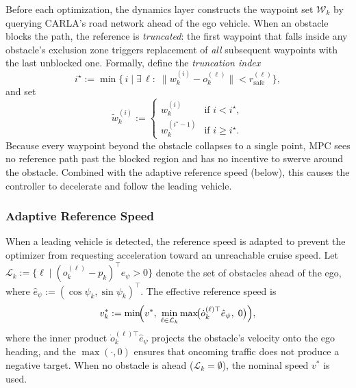 \documentclass[conference]{IEEEtran}
\newcommand{\calW}{\mathcal{W}}
\newcommand{\calL}{\mathcal{L}}
\begin{document}
Before each optimization, the dynamics layer constructs the
waypoint set $\calW_k$ by querying CARLA's road network ahead
of the ego vehicle.
When an obstacle blocks the path, the reference is
\emph{truncated}: the first waypoint that falls inside any
obstacle's exclusion zone triggers replacement of \emph{all}
subsequent waypoints with the last unblocked one.  Formally,
define the \emph{truncation index}
\begin{equation}\label{eq:trunc_idx}
  i^\star := \min\bigl\{\,i \;\big|\;
    \exists\,\ell:\;
    \bigl\|w^{(i)}_k - o^{(\ell)}_k\bigr\|
    < r_{\mathrm{safe}}^{(\ell)}\bigr\},
\end{equation}
and set
\begin{equation}\label{eq:wp_filter}
  \tilde{w}^{(i)}_k :=
  \begin{cases}
    w^{(i)}_k & \text{if } i < i^\star, \\[3pt]
    w^{(i^\star - 1)}_k & \text{if } i \ge i^\star.
  \end{cases}
\end{equation}
Because every waypoint beyond the obstacle collapses to a single
point, MPC sees no reference path past the blocked region and has
no incentive to swerve around the obstacle.  Combined with the
adaptive reference speed (below), this causes the controller to
decelerate and follow the leading vehicle.

\subsubsection{Adaptive Reference Speed}\label{sec:adaptive_speed}

When a leading vehicle is detected, the reference speed is
adapted to prevent the optimizer from requesting acceleration
toward an unreachable cruise speed.  Let
$\calL_k := \{\ell \mid (o_k^{(\ell)} - p_k)^\top
\hat{e}_\psi > 0\}$ denote the set of obstacles ahead of the
ego, where $\hat{e}_\psi := (\cos\psi_k, \sin\psi_k)^\top$.
The effective reference speed is
\begin{equation}\label{eq:adaptive_speed}
  v^*_k := \min\!\Bigl(v^*,\;
    \min_{\ell \in \calL_k}
    \max\!\bigl(\dot{o}_k^{(\ell)\top} \hat{e}_\psi,\; 0\bigr)
  \Bigr),
\end{equation}
where the inner product
$\dot{o}_k^{(\ell)\top}\hat{e}_\psi$ projects the obstacle's
velocity onto the ego heading, and the $\max(\cdot,0)$ ensures
that oncoming traffic does not produce a negative target.
When no obstacle is ahead ($\calL_k = \emptyset$), the nominal
speed $v^*$ is used.
\end{document}
